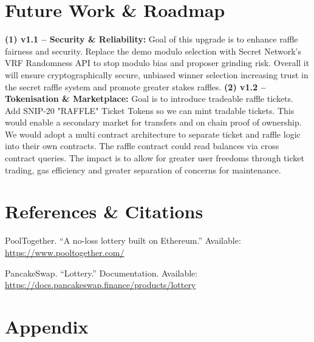 \documentclass{article}
\begin{document}
\section{Future Work \& Roadmap}

\textbf{(1) v1.1 – Security \& Reliability:} Goal of this upgrade is to enhance raffle fairness and security. Replace the demo modulo selection with Secret Network's VRF Randomness API to stop modulo bias and proposer grinding risk. Overall it will ensure cryptographically secure, unbiased winner selection increasing trust in the secret raffle system and promote greater stakes raffles. \textbf{(2) v1.2 – Tokenisation \& Marketplace:} Goal is to introduce tradeable raffle tickets. Add SNIP-20 "RAFFLE" Ticket Tokens so we can mint tradable tickets. This would enable a secondary market for transfers and on chain proof of ownership. We would adopt a multi contract architecture to separate ticket and raffle logic into their own contracts. The raffle contract could read balances via cross contract queries. The impact is to allow for greater user freedoms through ticket trading, gas efficiency and greater separation of concerns for maintenance.

\section{References \& Citations}
\begin{thebibliography}{9}

PoolTogether. ``A no-loss lottery built on Ethereum.'' Available: \url{https://www.pooltogether.com/}

PancakeSwap. ``Lottery.'' Documentation. Available: \url{https://docs.pancakeswap.finance/products/lottery}
\end{thebibliography}

\newpage

\section{Appendix}
\end{document}
